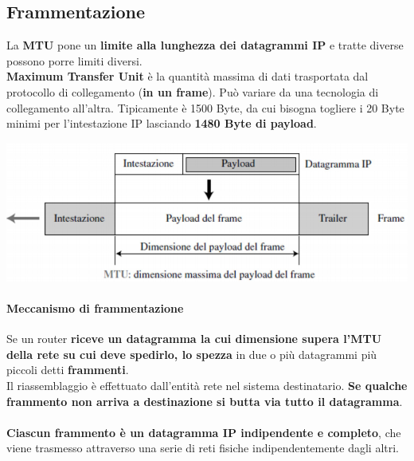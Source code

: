 \documentclass[10pt]{article}
\begin{document}
\subsection{Frammentazione}
La \textbf{MTU} pone un \textbf{limite alla lunghezza dei datagrammi IP} e tratte diverse possono porre limiti diversi.\\
\textbf{Maximum Transfer Unit} è la quantità massima di dati trasportata dal protocollo di collegamento (\textbf{in un frame}). Può variare da una tecnologia di collegamento all'altra. Tipicamente è 1500 Byte, da cui bisogna togliere i 20 Byte minimi per l'intestazione IP lasciando \textbf{1480 Byte di payload}.
\begin{center}
\includegraphics[scale=0.7]{ipmtu.png}
\end{center}
\paragraph{Meccanismo di frammentazione} Se un router \textbf{riceve un datagramma la cui dimensione supera l'MTU della rete su cui deve spedirlo, lo spezza} in due o più datagrammi più piccoli detti \textbf{frammenti}.\\
Il riassemblaggio è effettuato dall'entità rete nel sistema destinatario. \textbf{Se qualche frammento non arriva a destinazione si butta via tutto il datagramma}.\\\\
\textbf{Ciascun frammento è un datagramma IP indipendente e completo}, che viene trasmesso attraverso una serie di reti fisiche indipendentemente dagli altri.
\pagebreak
\end{document}
